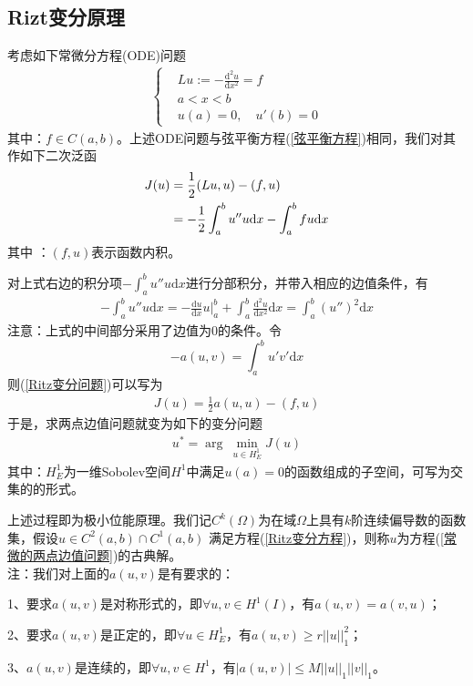     \subsection{Rizt变分原理}
        \label{subsec:Rizt变分原理}
        \par
        考虑如下常微分方程(ODE)问题
        \begin{align}
            \label{常微的两点边值问题}
            \left\{
                \begin{aligned}
                &Lu:= - \frac{\mathrm{d} ^2u}{\mathrm{d} x^2} = f\\
                &a<x<b\\
                &u(a) = 0,\quad u'(b ) = 0
                \end{aligned}
            \right.
        \end{align}
        其中：$f\in C(a,b)$。上述ODE问题与弦平衡方程(\ref{弦平衡方程})相同，我们对其作如下二次泛函
        \begin{align}
            \label{Ritz变分问题}
            J(u) &= \frac 12  (Lu,u) - (f,u)\notag \\
                 & = -\frac12 \int_a^b u''u\mathrm{d}x - \int_a^b fu \mathrm{d}x
        \end{align}
        其中 ：$(f,u)$表示函数内积。
        \par
        对上式右边的积分项$-\int_a^b u''u\mathrm{d}x$进行分部积分，并带入相应的边值条件，有
        \begin{align*}
            -\int_a^b u''u\mathrm{d} x = -\frac{\mathrm{d} u}{\mathrm{d} x} u \Big|_a^b + \int_a^b \frac{\mathrm{d}^2 u}{\mathrm{d} x^2} \mathrm{d} x = \int_a^b (u'')^2 \mathrm{d} x
        \end{align*}
        注意：上式的中间部分采用了边值为0的条件。令
        \[
            -a(u,v) = \int_a^b u'v' \mathrm{d} x
        \]
        则(\ref{Ritz变分问题})可以写为
        \begin{align}
        \label{Ritz变分方程}
        J(u) = \frac{1}{2} a(u,u) - (f,u)
        \end{align}
        于是，求两点边值问题就变为如下的变分问题
        \begin{align*}
            u^* = \arg \ \min_{u\in H_E^1}J(u)
        \end{align*}
        其中：$H_E^1$为一维Sobolev空间$H^1$中满足$u(a) = 0$的函数组成的子空间，可写为交集的的形式。
        \par
        上述过程即为极小位能原理。我们记$C^k(\Omega)$为在域$\Omega$上具有$k$阶连续偏导数的函数集，假设$u\in C^2(a,b) \cap C^1(a,b)$ 满足方程(\ref{Ritz变分方程})，则称$u$为方程(\ref{常微的两点边值问题})的古典解。\\
        注\label{极小位能的要求}：我们对上面的$a(u,v)$是有要求的：\par
        1、要求$a(u,v)$是对称形式的，即$\forall u,v \in H^1(I)$，有$a(u,v) = a(v,u)$；\par
        2、要求$a(u,v)$是正定的，即$\forall u \in H_E^1$，有$a(u,v) \geqslant r||u||_1^2$；\par
        3、$a(u,v)$是连续的，即$\forall u,v\in H^1$，有$|a(u,v)| \leqslant M||u||_1||v||_1$。

